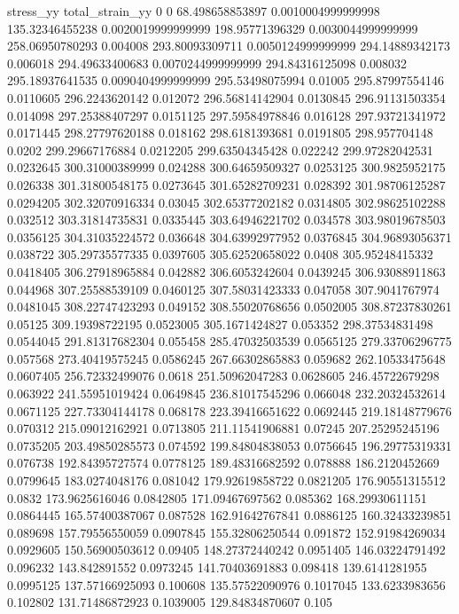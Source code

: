 stress_yy total_strain_yy
0 0
68.498658853897 0.0010004999999998
135.32346455238 0.0020019999999999
198.95771396329 0.0030044999999999
258.06950780293 0.004008
293.80093309711 0.0050124999999999
294.14889342173 0.006018
294.49633400683 0.0070244999999999
294.84316125098 0.008032
295.18937641535 0.0090404999999999
295.53498075994 0.01005
295.87997554146 0.0110605
296.2243620142 0.012072
296.56814142904 0.0130845
296.91131503354 0.014098
297.25388407297 0.0151125
297.59584978846 0.016128
297.93721341972 0.0171445
298.27797620188 0.018162
298.6181393681 0.0191805
298.957704148 0.0202
299.29667176884 0.0212205
299.63504345428 0.022242
299.97282042531 0.0232645
300.31000389999 0.024288
300.64659509327 0.0253125
300.9825952175 0.026338
301.31800548175 0.0273645
301.65282709231 0.028392
301.98706125287 0.0294205
302.32070916334 0.03045
302.65377202182 0.0314805
302.98625102288 0.032512
303.31814735831 0.0335445
303.64946221702 0.034578
303.98019678503 0.0356125
304.31035224572 0.036648
304.63992977952 0.0376845
304.96893056371 0.038722
305.29735577335 0.0397605
305.62520658022 0.0408
305.95248415332 0.0418405
306.27918965884 0.042882
306.6053242604 0.0439245
306.93088911863 0.044968
307.25588539109 0.0460125
307.58031423333 0.047058
307.9041767974 0.0481045
308.22747423293 0.049152
308.55020768656 0.0502005
308.87237830261 0.05125
309.19398722195 0.0523005
305.1671424827 0.053352
298.37534831498 0.0544045
291.81317682304 0.055458
285.47032503539 0.0565125
279.33706296775 0.057568
273.40419575245 0.0586245
267.66302865883 0.059682
262.10533475648 0.0607405
256.72332499076 0.0618
251.50962047283 0.0628605
246.45722679298 0.063922
241.55951019424 0.0649845
236.81017545296 0.066048
232.20324532614 0.0671125
227.73304144178 0.068178
223.39416651622 0.0692445
219.18148779676 0.070312
215.09012162921 0.0713805
211.11541906881 0.07245
207.25295245196 0.0735205
203.49850285573 0.074592
199.84804838053 0.0756645
196.29775319331 0.076738
192.84395727574 0.0778125
189.48316682592 0.078888
186.2120452669 0.0799645
183.0274048176 0.081042
179.92619858722 0.0821205
176.90551315512 0.0832
173.9625616046 0.0842805
171.09467697562 0.085362
168.29930611151 0.0864445
165.57400387067 0.087528
162.91642767841 0.0886125
160.32433239851 0.089698
157.79556550059 0.0907845
155.32806250544 0.091872
152.91984269034 0.0929605
150.56900503612 0.09405
148.27372440242 0.0951405
146.03224791492 0.096232
143.842891552 0.0973245
141.70403691883 0.098418
139.6141281955 0.0995125
137.57166925093 0.100608
135.57522090976 0.1017045
133.6233983656 0.102802
131.71486872923 0.1039005
129.84834870607 0.105

